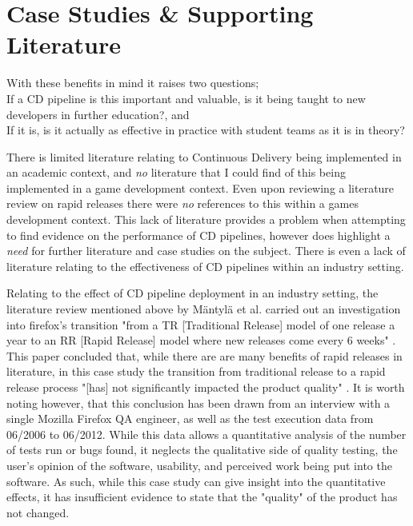\documentclass[journal]{IEEEtran}
\begin{document}
\section{Case Studies \& Supporting Literature}
With these benefits in mind it raises two questions; \\
If a CD pipeline is this important and valuable, is it being taught to new developers in further education?, and \\
If it is, is it actually as effective in practice with student teams as it is in theory?

There is limited literature relating to Continuous Delivery being implemented in an academic context, and \textit{no} literature that I could find of this being implemented in a game development context. Even upon reviewing a literature review on rapid releases\cite{mantyla2015rapid} there were \textit{no} references to this within a games development context. This lack of literature provides a problem when attempting to find evidence on the performance of CD pipelines, however does highlight a \textit{need} for further literature and case studies on the subject. There is even a lack of literature relating to the effectiveness of CD pipelines within an industry setting.

Relating to the effect of CD pipeline deployment in an industry setting, the literature review mentioned above by M{\"a}ntyl{\"a} et al.\cite{mantyla2015rapid} carried out an investigation into firefox's transition "from a TR [Traditional Release] model of one release a year to an RR [Rapid Release] model where new releases come every 6 weeks" \cite[p.2]{mantyla2015rapid}. This paper concluded that, while there are are many benefits of rapid releases in literature, in this case study the transition from traditional release to a rapid release process "[has] not significantly impacted the product quality" \cite[p.40]{mantyla2015rapid}. It is worth noting however, that this conclusion has been drawn from an interview with a single Mozilla Firefox QA engineer, as well as the test execution data from 06/2006 to 06/2012. While this data allows a quantitative analysis of the number of tests run or bugs found, it neglects the qualitative side of quality testing, the user's opinion of the software, usability, and perceived work being put into the software. As such, while this case study can give insight into the quantitative effects, it has insufficient evidence to state that the "quality" of the product has not changed\cite{kan2003metrics}.
\end{document}
